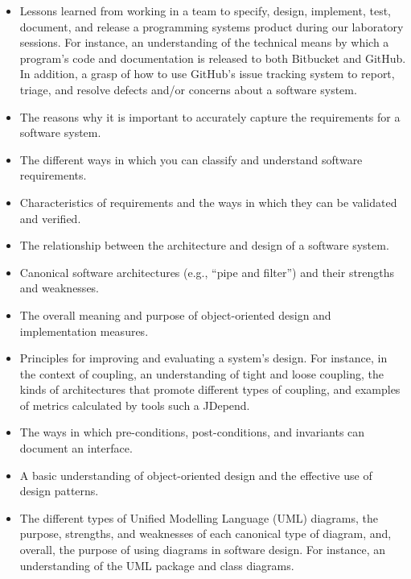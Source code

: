 \begin{itemize}
  \item Lessons learned from working in a team to specify, design, implement, test, document, and release a programming
    systems product during our laboratory sessions. For instance, an understanding of the technical means by which a
    program's code and documentation is released to both Bitbucket and GitHub. In addition, a grasp of how to use
    GitHub's issue tracking system to report, triage, and resolve defects and/or concerns about a software system.

  \item The reasons why it is important to accurately capture the requirements for a software system.

  \item The different ways in which you can classify and understand software requirements.

  \item Characteristics of requirements and the ways in which they can be validated and verified.

  \item The relationship between the architecture and design of a software system.

  \item Canonical software architectures (e.g., ``pipe and filter'') and their strengths and weaknesses.

  \item The overall meaning and purpose of object-oriented design and implementation measures.

  \item Principles for improving and evaluating a system's design. For instance, in the context of coupling, an
    understanding of tight and loose coupling, the kinds of architectures that promote different types of coupling, and
    examples of metrics calculated by tools such a JDepend.

  \item The ways in which pre-conditions, post-conditions, and invariants can document an interface.

  \item A basic understanding of object-oriented design and the effective use of design patterns.

  \item The different types of Unified Modelling Language (UML) diagrams, the purpose, strengths, and weaknesses of each
    canonical type of diagram, and, overall, the purpose of using diagrams in software design. For instance, an
    understanding of the UML package and class diagrams.


\end{itemize}
